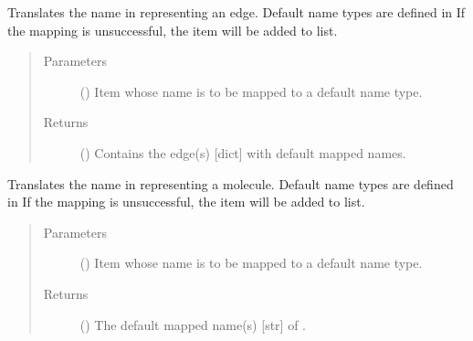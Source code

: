 \documentclass[letterpaper,10pt,english]{sphinxmanual}
\begin{document}
\begin{fulllineitems}

\begin{fulllineitems}
\label{\detokenize{main:pypath.main.PyPath.map_edge}}
Translates the name in  representing an edge. Default
name types are defined in
 If the mapping
is unsuccessful, the item will be added to
 list.
\begin{quote}\begin{description}
\item[{Parameters}] \leavevmode
{} () \textendash{} Item whose name is to be mapped to a default name type.

\item[{Returns}] \leavevmode
() \textendash{} Contains the edge(s) {[}dict{]} with default mapped
names.

\end{description}\end{quote}

\end{fulllineitems}


\begin{fulllineitems}
\label{\detokenize{main:pypath.main.PyPath.map_item}}
Translates the name in  representing a molecule. Default
name types are defined in
 If the mapping
is unsuccessful, the item will be added to
 list.
\begin{quote}\begin{description}
\item[{Parameters}] \leavevmode
{} () \textendash{} Item whose name is to be mapped to a default name type.

\item[{Returns}] \leavevmode
() \textendash{} The default mapped name(s) {[}str{]} of .


\end{description}
\end{quote}
\end{fulllineitems}
\end{fulllineitems}
\end{document}
